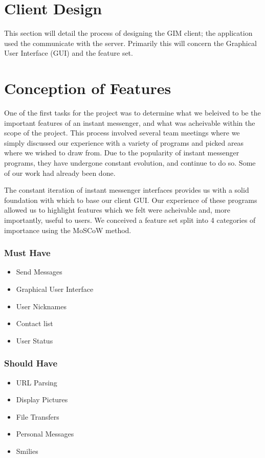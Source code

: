 \section{Client Design}

This section will detail the process of designing the GIM client; the application used the communicate with the server. Primarily this will concern the Graphical User Interface (GUI) and the feature set.

\section{Conception of Features}

One of the first tasks for the project was to determine what we beleived to be the important features of an instant messenger, and what was acheivable within the scope of the project. This process involved several team meetings where we simply discussed our experience with a variety of programs and picked areas where we wished to draw from. Due to the popularity of instant messenger programs, they have undergone constant evolution, and continue to do so. Some of our work had already been done.

The constant iteration of instant messenger interfaces provides us with a solid foundation with which to base our client GUI. Our experience of these programs allowed us to highlight features which we felt were acheivable and, more importantly, useful to users. We conceived a feature set split into 4 categories of importance using the MoSCoW method.

\subsubsection{Must Have}

\begin{itemize}
\item{Send Messages}
\item{Graphical User Interface}
\item{User Nicknames}
\item{Contact list}
\item{User Status}
\end{itemize}

\subsubsection{Should Have}

\begin{itemize}
\item{URL Parsing}
\item{Display Pictures}
\item{File Transfers}
\item{Personal Messages}
\item{Smilies}
\end{itemize}

